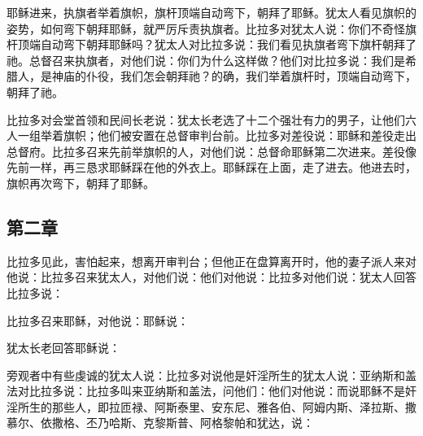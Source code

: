 耶稣进来，执旗者举着旗帜，旗杆顶端自动弯下，朝拜了耶稣。犹太人看见旗帜的姿势，如何弯下朝拜耶稣，就严厉斥责执旗者。比拉多对犹太人说：你们不奇怪旗杆顶端自动弯下朝拜耶稣吗？犹太人对比拉多说：我们看见执旗者弯下旗杆朝拜了祂。总督召来执旗者，对他们说：你们为什么这样做？他们对比拉多说：我们是希腊人，是神庙的仆役，我们怎会朝拜祂？的确，我们举着旗杆时，顶端自动弯下，朝拜了祂。\par

比拉多对会堂首领和民间长老说：犹太长老选了十二个强壮有力的男子，让他们六人一组举着旗帜；他们被安置在总督审判台前。比拉多对差役说：耶稣和差役走出总督府。比拉多召来先前举旗帜的人，对他们说：总督命耶稣第二次进来。差役像先前一样，再三恳求耶稣踩在他的外衣上。耶稣踩在上面，走了进去。他进去时，旗帜再次弯下，朝拜了耶稣。\par


\subsection{第二章}

比拉多见此，害怕起来，想离开审判台；但他正在盘算离开时，他的妻子派人来对他说：比拉多召来犹太人，对他们说：他们对他说：比拉多对他们说：犹太人回答比拉多说：\par

比拉多召来耶稣，对他说：耶稣说：\par

犹太长老回答耶稣说：\par

旁观者中有些虔诚的犹太人说：比拉多对说他是奸淫所生的犹太人说：亚纳斯和盖法对比拉多说：比拉多叫来亚纳斯和盖法，问他们：他们对他说：而说耶稣不是奸淫所生的那些人，即拉匝禄、阿斯泰里、安东尼、雅各伯、阿姆内斯、泽拉斯、撒慕尔、依撒格、丕乃哈斯、克黎斯普、阿格黎帕和犹达，说：\par

